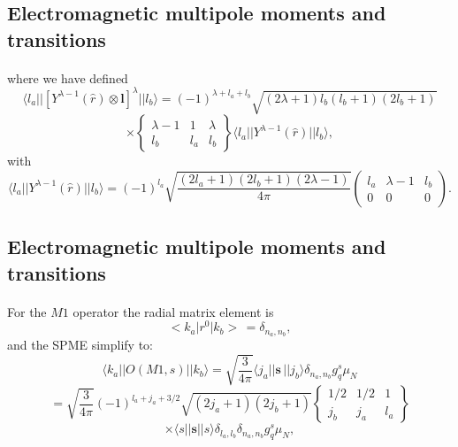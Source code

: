\documentclass[%
oneside,                 %
final,                   %
10pt]{article}
\begin{document}
\subsection{Electromagnetic multipole moments and transitions}

\paragraph{}
where we have defined
\[
\langle l _{a}\vert\vert [Y^{\lambda -1}(\hat{r})\otimes\mathbf{l}]^{\lambda }\vert\vert l _{b}\rangle=(-1)^{\lambda +l _{a}+l _{b}} \sqrt{(2\lambda +1)l _{b}(l _{b}+1)(2l _{b}+1)}
\]
\[
\times\left\{\begin{array}{ccc}  {\lambda -1} & {1}&  {\lambda}\\   {l _{b}}&  {l _{a}} &  {l _{b}} \end{array}\right\}
\langle l _{a}\vert\vert Y^{\lambda -1}(\hat{r})\vert\vert l _{b}\rangle,
\]
with
\[
\langle l _{a}\vert\vert Y^{\lambda -1}(\hat{r})\vert\vert l _{b}\rangle=(-1)^{l _{a}} \sqrt{\frac{(2l _{a}+1)(2l _{b}+1)(2\lambda -1)}{4\pi }}\left(\begin{array}{ccc}  {l _{a}} & {\lambda -1} & {l _{b}}\\  {0} & {0}&  {0}\end{array}\right)
. 
\]



\subsection{Electromagnetic multipole moments and transitions}

\paragraph{}
For the $M1$ operator the radial matrix element is
\[
<k_{a}\vert r^{0}\vert k_{b}>\, = \delta _{n_{a},n_{b}},
\]
and the SPME simplify to:
\[
\langle k_{a}\vert\vert O(M1,s)\vert\vert k_{b}\rangle=\sqrt{ \frac{3}{4\pi }}\langle j_{a}\vert\vert \mathbf{s}\,\vert\vert j_{b}\rangle \delta _{n_{a},n_{b}}g^{s}_{q}\mu_{N}
\]
\[
=\sqrt{ \frac{3}{4\pi }}(-1)^{l _{a}+j_{a}+3/2}
\sqrt{(2j_{a}+1)(2j_{b}+1)}\left\{\begin{array}{ccc}  {1/2}&  {1/2} & {1} \\ {j_{b}} & {j_{a}}&  {l _{a}}\end{array}\right\}
\]
\[
\times\langle s\vert\vert \mathbf{s}\vert\vert s\rangle \delta _{l _{a},l _{b}} \delta _{n_{a},n_{b}}g^{s}_{q}\mu _{N},
\]
\end{document}

